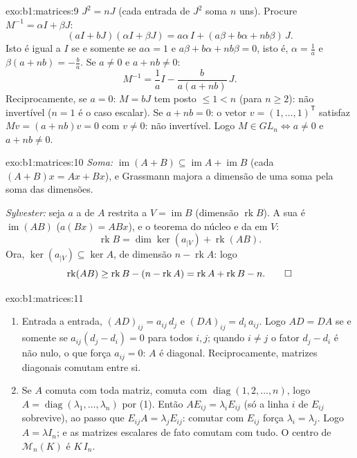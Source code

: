 \begin{solution}{exo:b1:matrices:9}
$J^2 = nJ$ (cada entrada de $J^2$ soma $n$ uns). Procure $M^{-1} =
\alpha I + \beta J$:
\[
(aI + bJ)(\alpha I + \beta J)
= a\alpha\, I + (a\beta + b\alpha + nb\beta)\, J .
\]
Isto é igual a $I$ se e somente se $a\alpha = 1$ e $a\beta + b\alpha + nb\beta =
0$, isto é, $\alpha = \frac1a$ e
$\beta(a + nb) = -\frac ba$. Se $a
\neq 0$ e $a + nb \neq 0$:
\[
M^{-1} = \frac 1a I - \frac{b}{a(a + nb)}\, J .
\]
Reciprocamente, se $a = 0$: $M = bJ$ tem posto $\leq 1 < n$ (para $n \geq
2$):
não invertível ($n = 1$ é o caso escalar). Se $a + nb = 0$: o vetor $v = (1, \dots, 1)^{\mathsf T}$
satisfaz $Mv = (a +
nb)v = 0$ com $v \neq 0$: não invertível. Logo $M \in GL_n \iff a
\neq 0$ e $a + nb \neq 0$.
\end{solution}

\begin{solution}{exo:b1:matrices:10}
\emph{Soma:} $\operatorname{im}(A + B) \subseteq \operatorname{im} A
+ \operatorname{im} B$ (cada $(A+B)x = Ax + Bx$), e Grassmann majora a dimensão de
uma soma pela soma das dimensões.

\emph{Sylvester:} seja $a$ a  de $A$ restrita a $V =
\operatorname{im} B$
(dimensão $\operatorname{rk} B$). A sua  é $\operatorname{im}(AB)$ ($a(Bx) = ABx$), e o teorema do
núcleo e da  em $V$:
\[
\operatorname{rk} B = \dim\ker(a_{|V}) + \operatorname{rk}(AB) .
\]
Ora, $\ker(a_{|V}) \subseteq \ker A$, de dimensão $n -
\operatorname{rk} A$: logo
\[
\operatorname{rk}(AB) \geq \operatorname{rk} B - (n -
\operatorname{rk} A) = \operatorname{rk} A + \operatorname{rk} B -
n . \qedhere
\]
\end{solution}

\begin{solution}{exo:b1:matrices:11}
\begin{enumerate}
  \item Entrada a entrada, $(AD)_{ij} = a_{ij}\,d_j$ e $(DA)_{ij} =
        d_i\,a_{ij}$. Logo $AD = DA$ se e
        somente se $a_{ij}(d_j - d_i) = 0$ para todos $i, j$; quando $i \neq j$ o fator
        $d_j - d_i$ é não nulo, o que força $a_{ij} = 0$: $A$ é diagonal.
        Reciprocamente, matrizes diagonais comutam entre si.
  \item Se $A$ comuta com toda matriz, comuta com $\operatorname{diag}(1, 2, \dots, n)$, logo $A =
        \operatorname{diag}(\lambda_1, \dots, \lambda_n)$
        por (1). Então $A E_{ij} = \lambda_i E_{ij}$ (só a linha $i$ de $E_{ij}$
        sobrevive), ao passo que $E_{ij} A = \lambda_j E_{ij}$: comutar com $E_{ij}$ força
        $\lambda_i = \lambda_j$. Logo $A = \lambda I_n$; e as matrizes escalares de fato
        comutam com tudo. O centro de $\mathcal{M}_n(K)$ é $K\,I_n$.
\end{enumerate}
\end{solution}


